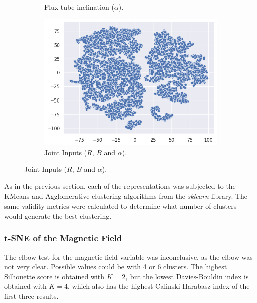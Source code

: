 \begin{figure}[h]
\begin{subfigure}[h]{0.329\textwidth}
        \caption{Flux-tube inclination ($\alpha$).}
        \label{fig:tsne_alpha_2d}
    \end{subfigure}
    \begin{subfigure}[h]{0.329\textwidth}
        \centering
        \includegraphics[width=\textwidth]{figures/tsne_joint_2d.png}
        \caption{Joint Inputs ($R$, $B$ and $\alpha$).}
        \label{fig:tsne_joint_2d}
    \end{subfigure}
\end{figure}

As in the previous section, each of the representations was subjected to the KMeans and Agglomerative clustering algorithms from the \textit{sklearn} library. The same validity metrics were calculated to determine what number of clusters would generate the best clustering.

\subsubsection{t-SNE of the Magnetic Field}\label{sec:tsne_b}
The elbow test for the magnetic field variable was inconclusive, as the elbow was not very clear. Possible values could be with 4 or 6 clusters. The highest Silhouette score is obtained with $K=2$, but the lowest Davies-Bouldin index is obtained with $K=4$, which also has the highest Calinski-Harabasz index of the first three results. 


